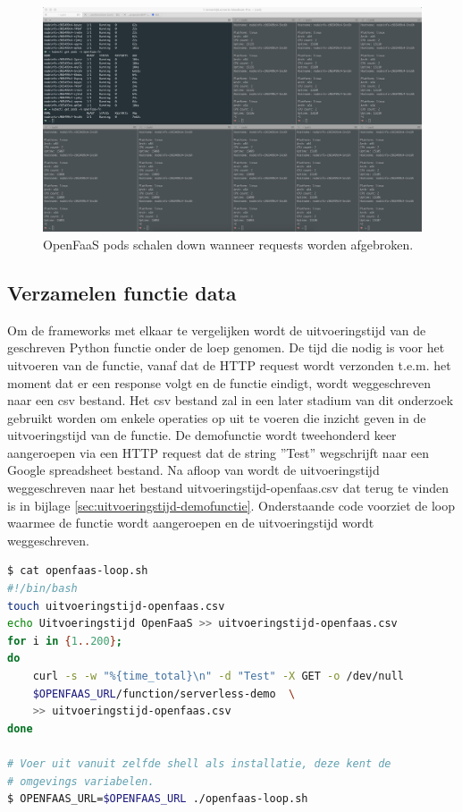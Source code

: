 \begin{figure}
    \includegraphics[width=1\textwidth]{img/openfaas-scalability-3.png}
    \caption{OpenFaaS pods schalen down wanneer requests worden afgebroken.}
    \label{fig:openfaas-scalability-3}  
\end{figure}

\newpage
\subsection{Verzamelen functie data}
Om de frameworks met elkaar te vergelijken wordt de uitvoeringstijd van de geschreven Python functie onder de loep genomen. De tijd die nodig is voor het uitvoeren van de functie, vanaf dat de HTTP request wordt verzonden t.e.m. het moment dat er een response volgt en de functie eindigt, wordt weggeschreven naar een csv bestand. Het csv bestand zal in een later stadium van dit onderzoek gebruikt worden om enkele operaties op uit te voeren die inzicht geven in de uitvoeringstijd van de functie. De demofunctie wordt tweehonderd keer aangeroepen via een HTTP request dat de string ''Test'' wegschrijft naar een Google spreadsheet bestand. Na afloop van wordt de uitvoeringstijd weggeschreven naar het bestand uitvoeringstijd-openfaas.csv dat terug te vinden is in bijlage \ref{sec:uitvoeringstijd-demofunctie}. Onderstaande code voorziet de loop waarmee de functie wordt aangeroepen en de uitvoeringstijd wordt weggeschreven. 

\begin{lstlisting}[language=bash]
$ cat openfaas-loop.sh
#!/bin/bash
touch uitvoeringstijd-openfaas.csv
echo Uitvoeringstijd OpenFaaS >> uitvoeringstijd-openfaas.csv
for i in {1..200};
do
    curl -s -w "%{time_total}\n" -d "Test" -X GET -o /dev/null
    $OPENFAAS_URL/function/serverless-demo  \
    >> uitvoeringstijd-openfaas.csv
done

# Voer uit vanuit zelfde shell als installatie, deze kent de 
# omgevings variabelen.
$ OPENFAAS_URL=$OPENFAAS_URL ./openfaas-loop.sh
\end{lstlisting}

